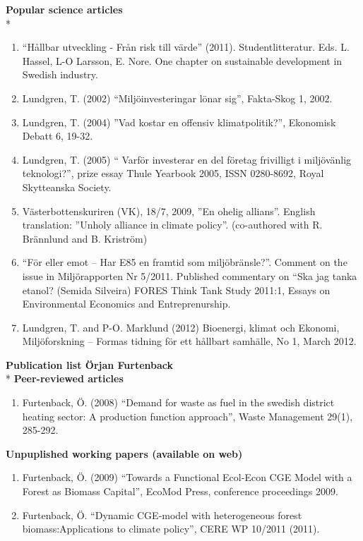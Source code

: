\textbf{Popular science articles}\\*
\begin{enumerate}
	\item “Hållbar utveckling - Från risk till värde” (2011). Studentlitteratur. Eds. L. Hassel, L-O Larsson, E. Nore. One chapter on sustainable development in Swedish industry.
	\item Lundgren, T. (2002) “Miljöinvesteringar lönar sig”, Fakta-Skog 1, 2002.
	\item Lundgren, T. (2004) ”Vad kostar en offensiv klimatpolitik?”, Ekonomisk Debatt 6, 19-32.
	\item Lundgren, T. (2005) “ Varför investerar en del företag frivilligt i miljövänlig teknologi?”, prize essay Thule Yearbook 2005, ISSN 0280-8692, Royal Skytteanska Society.
	\item Västerbottenskuriren (VK), 18/7, 2009, ”En ohelig allians”. English translation: ”Unholy alliance in climate policy”. (co-authored with R. Brännlund and B. Kriström)
	\item “För eller emot – Har E85 en framtid som miljöbränsle?”. Comment on the issue in Miljörapporten Nr 5/2011. Published commentary on “Ska jag tanka etanol? (Semida Silveira) FORES Think Tank Study 2011:1, Essays on Environmental Economics and Entreprenurship.
	\item Lundgren, T. and P-O. Marklund (2012) Bioenergi, klimat och Ekonomi, Miljöforskning – Formas tidning för ett hållbart samhälle, No 1, March 2012.
\end{enumerate}


\textbf{Publication list Örjan Furtenback}\\*
\textbf{Peer-reviewed articles}
\begin{enumerate}
	\item Furtenback, Ö. (2008) “Demand for waste as fuel in the swedish district heating sector: A production function approach”, Waste Management 29(1), 285-292.
\end{enumerate}

\textbf{Unpuplished working papers (available on web)}
\begin{enumerate}
	\item Furtenback, Ö. (2009) “Towards a Functional Ecol-Econ CGE Model with a Forest as Biomass Capital”, EcoMod Press, conference proceedings 2009.
	\item Furtenback, Ö.  “Dynamic CGE-model with heterogeneous forest biomass:Applications to climate policy”, CERE WP 10/2011 (2011).
\end{enumerate}

